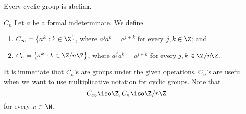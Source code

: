 \documentclass[pmath347]{subfiles}
\begin{document}
    \begin{cor}{}
        Every cyclic group is abelian.
    \end{cor}	

    \begin{definition}{$C_{n}$}{}
        Let $a$ be a formal indeterminate. We define
        \begin{enumerate}
            \item $C_{\infty} = \left\lbrace a^k:k\in\Z \right\rbrace$, where $a^ja^k = a^{j+k}$ for every $j,k\in\Z$; and
            \item $C_n = \left\lbrace a^k: k\in \Z /n\Z \right\rbrace$, where $a^ja^k=a^{j+k}$ for every $j,k\in\Z /n\Z$.
        \end{enumerate}
    \end{definition}

    \np It is immediate that $C_n$'s are groups under the given operations. $C_n$'s are useful when we want to use multiplicative notation for cyclic groups. Note that
    \begin{equation*}
        C_{\infty} \iso \Z, C_n\iso \Z/n\Z
    \end{equation*}
    for every $n\in\N$.
    
    
    
    
    
    
    
    
    
    
    
    
    
    
    
    
    
    
    
    
    
    
    
    
    
    
    
    
    
    
    
    
    
    
    
\end{document}
